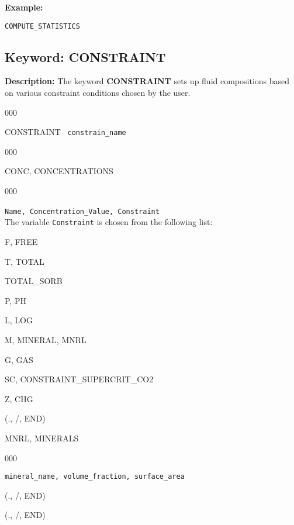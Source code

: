 \documentclass[12pt]{article}
\begin{document}
\noindent
{\bf Example:}
\begin{verbatim}
COMPUTE_STATISTICS
\end{verbatim}


\newpage
\protect\hypertarget{target_constraint}{}

\subsection{Keyword: CONSTRAINT}

\noindent
{\bf Description:}
The keyword {\bf CONSTRAINT} sets up fluid compositions based on various constraint conditions chosen by the user.

\begin{deflist}{000}
\item [CONSTRAINT] \ {\tt constrain\_name}
\begin{deflist}{000}
\item[CONC, CONCENTRATIONS]
\begin{deflist}{000}
\item[{\tt Name, Concentration\_Value, Constraint}] ~\\
The variable {\tt Constraint} is chosen from the following list:
\item[F, FREE]
\item[T, TOTAL] 
\item[TOTAL\_SORB]
\item[P, PH]
\item[L, LOG] 
\item[M, MINERAL, MNRL]
\item[G, GAS]
\item[SC, CONSTRAINT\_SUPERCRIT\_CO2] 
\item[Z, CHG]
\end{deflist}
\item[(., /, END)]
\item[MNRL, MINERALS] ~
\begin{deflist}{000}
\item[{\tt mineral\_name, volume\_fraction, surface\_area}]
\end{deflist}
\item[(., /, END)]
\end{deflist}
\item[(., /, END)]
\end{deflist}

\end{document}

